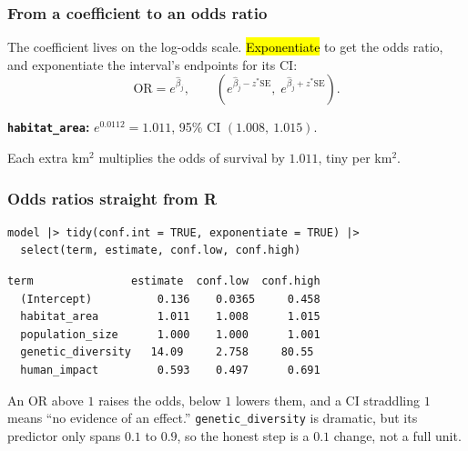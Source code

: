 \documentclass[slidestop,compress,mathserif]{beamer}
\begin{document}
\begin{frame}
\frametitle{From a coefficient to an odds ratio}

The coefficient lives on the log-odds scale. \hl{Exponentiate} to get the odds ratio, and exponentiate the interval's endpoints for its CI:
$$\mathrm{OR} = e^{\hat\beta_j}, \qquad \left(e^{\hat\beta_j - z^\ast\mathrm{SE}},\; e^{\hat\beta_j + z^\ast\mathrm{SE}}\right).$$

\pause
\vspace{0.3em}
\textbf{\texttt{habitat\_area}:} $e^{0.0112} = 1.011$, 95\% CI $(1.008,\ 1.015)$.

{\small Each extra km$^2$ multiplies the odds of survival by $1.011$, tiny per km$^2$.}

\pause
\vspace{0.3em}

\end{frame}


\begin{frame}[fragile]
\frametitle{Odds ratios straight from R}

\begin{Verbatim}[fontsize=\small]
model |> tidy(conf.int = TRUE, exponentiate = TRUE) |>
  select(term, estimate, conf.low, conf.high)
\end{Verbatim}

\pause
\vspace{0.2em}
\begin{Verbatim}[fontsize=\small]
  term               estimate  conf.low  conf.high
  (Intercept)          0.136    0.0365     0.458
  habitat_area         1.011    1.008      1.015
  population_size      1.000    1.000      1.001
  genetic_diversity   14.09     2.758     80.55
  human_impact         0.593    0.497      0.691
\end{Verbatim}

\pause
\vspace{0.2em}
{\small An OR above $1$ raises the odds, below $1$ lowers them, and a CI straddling $1$ means ``no evidence of an effect.'' \texttt{genetic\_diversity} is dramatic, but its predictor only spans $0.1$ to $0.9$, so the honest step is a $0.1$ change, not a full unit.}

\end{frame}
\end{document}
